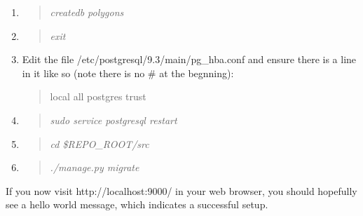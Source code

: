 \documentclass[12pt]{article}
\newenvironment{command}
   { 
      \begin{quote}\itshape
      \color{blue}
   }
   { \end{quote} }
\newenvironment{data}
   { 
      \begin{quote}\itshape
      \color{red}
   }
   { \end{quote} }
\begin{document}
\begin{enumerate}
   \item \begin{command} createdb polygons \end{command}
   \item \begin{command} exit \end{command}
   \item Edit the file /etc/postgresql/9.3/main/pg\_hba.conf and ensure there is
         a line in it like so (note there is no \# at the begnning):
         \begin{data}
         local all postgres trust
         \end{data}
   \item \begin{command} sudo service postgresql restart \end{command}
   \item \begin{command} cd \$REPO\_ROOT/src \end{command}
   \item \begin{command} ./manage.py migrate \end{command}
\end{enumerate}

If you now visit http://localhost:9000/ in your web browser, you should
hopefully see a hello world message, which indicates a successful setup.
\end{document}
